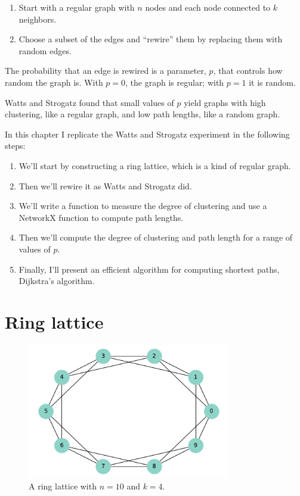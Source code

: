 \documentclass[12pt]{book}
\theoremstyle{exercise}
\begin{document}
\begin{enumerate}

\item Start with a regular graph with $n$ nodes and each node
  connected to $k$ neighbors.

\item Choose a subset of the edges and ``rewire'' them by
  replacing them with random edges.

\end{enumerate}

The probability that an edge is rewired is a parameter, $p$,
that controls how random the graph is.  With $p=0$, the graph
is regular; with $p=1$ it is random.

Watts and Strogatz found that small values of $p$ yield graphs
with high clustering, like a regular graph, and low path
lengths, like a random graph.

In this chapter I replicate the Watts and Strogatz experiment
in the following steps:

\begin{enumerate}

\item We'll start by constructing a ring lattice, which is a kind
of regular graph.

\item Then we'll rewire it as Watts and Strogatz did.

\item We'll write a function to measure the degree of clustering
and use a NetworkX function to compute path lengths.

\item Then we'll compute the degree of clustering and path length for
a range of values of $p$.

\item Finally, I'll present an efficient algorithm for computing shortest
paths, Dijkstra's algorithm.

\end{enumerate}


\section{Ring lattice}

\begin{figure}
\centerline{\includegraphics[width=3.5in]{figs/chap03-1.pdf}}
\caption{A ring lattice with $n=10$ and $k=4$.}
\label{chap03-1}
\end{figure}
\end{document}
